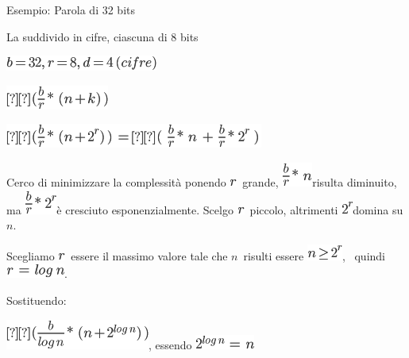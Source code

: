 \documentclass{article}
\begin{document}
{Esempio: Parola di 32 bits}

{La suddivido in cifre, ciascuna di 8 bits}

\includegraphics{images/image204.png}

\includegraphics{images/image205.png}

\includegraphics{images/image206.png}

{Cerco di minimizzare la complessità ponendo
}\includegraphics{images/image83.png}{~grande,
}\includegraphics{images/image207.png}{risulta diminuito, ma
}\includegraphics{images/image208.png}{è cresciuto esponenzialmente.
Scelgo }\includegraphics{images/image83.png}{~piccolo, altrimenti
}\includegraphics{images/image209.png}{domina su
}$n${.}

{Scegliamo }\includegraphics{images/image83.png}{~essere il massimo
valore tale che }$n${~risulti essere
}\includegraphics{images/image210.png}{, ~quindi
}\includegraphics{images/image211.png}{.}

{Sostituendo:}

\includegraphics{images/image212.png}{, essendo
}\includegraphics{images/image213.png}{~}
\end{document}
